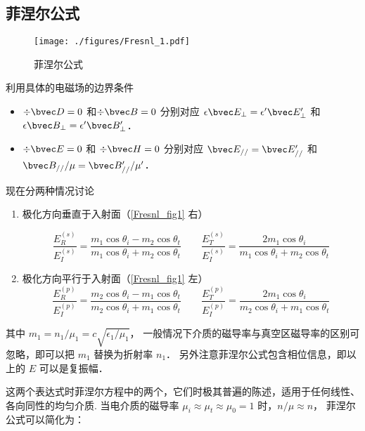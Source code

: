 

\subsection{菲涅尔公式}
\begin{figure}[ht]
\centering
\texttt{[image: ./figures/Fresnl\_1.pdf]}
\caption{菲涅尔公式} \label{Fresnl_fig1}
\end{figure}
 
利用具体的电磁场的边界条件 %
\begin{itemize}
\item $\div \bvec D = 0$ 和$\div \bvec B = 0$  分别对应 $\epsilon \bvec E_\bot = \epsilon' \bvec E'_\bot$ 和 $\epsilon \bvec B_\bot = \epsilon' \bvec B'_\bot$．

\item $\div \bvec E = 0$ 和 $\div \bvec H = 0$ 分别对应 $\bvec E_{//} = \bvec E'_{//}$ 和 $\bvec B_{//}/\mu = \bvec B'_{//}/\mu'$．
\end{itemize}

现在分两种情况讨论
\begin{enumerate}
\item 极化方向垂直于入射面（\autoref{Fresnl_fig1} 右）

\begin{equation}
\frac{E_R^{(s)}}{E_I^{(s)}} =  \frac{m_1\cos{\theta_i} - m_2\cos\theta_t}{m_1\cos\theta_i + m_2\cos\theta_t}
\qquad
\frac{E_T^{(s)}}{E_I^{(s)}} = \frac{2 m_1\cos\theta_i}{m_1\cos\theta_i + m_2\cos\theta_t}
\end{equation}

\item 极化方向平行于入射面（\autoref{Fresnl_fig1} 左）
\begin{equation}\label{Fresnl_eq2}
\frac{E_R^{(p)}}{E_I^{(p)}} =  \frac{m_2\cos\theta_i - m_1\cos\theta_t}{m_2 \cos\theta_i + m_1\cos\theta_t}
\qquad
\frac{E_T^{(p)}}{E_I^{(p)}} =  \frac{2 m_1\cos\theta_i}{m_2\cos\theta_i + m_1\cos\theta_t}
\end{equation}
\end{enumerate}
其中 $m_1=n_1/\mu_1 = c\sqrt{\epsilon_1/\mu_1}$， 一般情况下介质的磁导率与真空区磁导率的区别可忽略，即可以把 $m_1$ 替换为折射率 $n_1$． 另外注意菲涅尔公式包含相位信息，即以上的 $E$ 可以是复振幅．

这两个表达式时菲涅尔方程中的两个，它们时极其普遍的陈述，适用于任何线性、各向同性的均匀介质.%
当电介质的磁导率 $\mu_i\approx\mu_t\approx\mu_0=1$ 时，$n/\mu \approx n$， 菲涅尔公式可以简化为：

